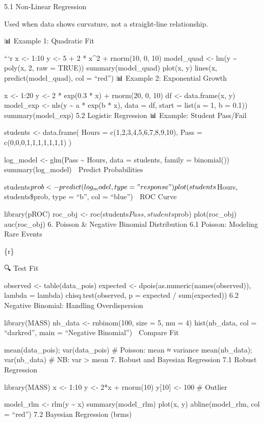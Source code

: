 \documentclass[
  letterpaper,
  DIV=11,
  numbers=noendperiod]{scrreprt}
\begin{document}
5.1 Non-Linear Regression

Used when data shows curvature, not a straight-line relationship.

📊 Example 1: Quadratic Fit

```r x \textless- 1:10 y \textless- 5 + 2 * x\^{}2 + rnorm(10, 0, 10)
model\_quad \textless- lm(y \textasciitilde{} poly(x, 2, raw = TRUE))
summary(model\_quad) plot(x, y) lines(x, predict(model\_quad), col =
``red'') 📊 Example 2: Exponential Growth

x \textless- 1:20 y \textless- 2 * exp(0.3 * x) + rnorm(20, 0, 10) df
\textless- data.frame(x, y) model\_exp \textless- nls(y
\textasciitilde{} a * exp(b * x), data = df, start = list(a = 1, b =
0.1)) summary(model\_exp) 5.2 Logistic Regression 📊 Example: Student
Pass/Fail

students \textless- data.frame( Hours = c(1,2,3,4,5,6,7,8,9,10), Pass =
c(0,0,0,1,1,1,1,1,1,1) )

log\_model \textless- glm(Pass \textasciitilde{} Hours, data = students,
family = binomial()) summary(log\_model) 🔁 Predict Probabilities

students\(prob <- predict(log_model, type = "response")
plot(students\)Hours, students\$prob, type = ``b'', col = ``blue'') 🎯
ROC Curve

library(pROC) roc\_obj \textless- roc(students\(Pass, students\)prob)
plot(roc\_obj) auc(roc\_obj) 6. Poisson \& Negative Binomial
Distribution 6.1 Poisson: Modeling Rare Events

\{r\}

🔍 Test Fit

observed \textless- table(data\_pois) expected \textless-
dpois(as.numeric(names(observed)), lambda = lambda) chisq.test(observed,
p = expected / sum(expected)) 6.2 Negative Binomial: Handling
Overdispersion

library(MASS) nb\_data \textless- rnbinom(100, size = 5, mu = 4)
hist(nb\_data, col = ``darkred'', main = ``Negative Binomial'') 🔬
Compare Fit

mean(data\_pois); var(data\_pois) \# Poisson: mean ≈ variance
mean(nb\_data); var(nb\_data) \# NB: var \textgreater{} mean 7. Robust
and Bayesian Regression 7.1 Robust Regression

library(MASS) x \textless- 1:10 y \textless- 2*x + rnorm(10) y{[}10{]}
\textless- 100 \# Outlier

model\_rlm \textless- rlm(y \textasciitilde{} x) summary(model\_rlm)
plot(x, y) abline(model\_rlm, col = ``red'') 7.2 Bayesian Regression
(brms)
\end{document}
